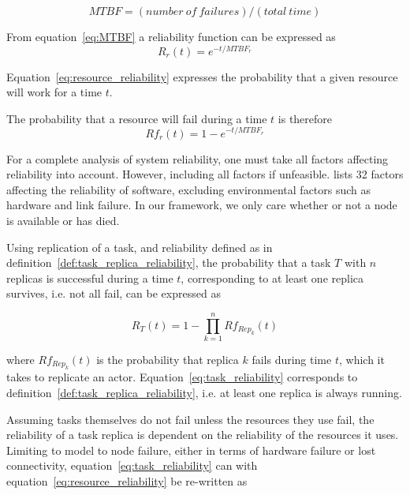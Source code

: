 \documentclass{cslthse-msc}
\begin{document}
\begin{equation} \label{eq:MTBF}
MTBF = (number\ of\ failures) / (total\ time)
\end{equation}

From equation~\ref{eq:MTBF} a reliability function can be expressed as 
\begin{equation} \label{eq:resource_reliability}
R_{r}(t) = e^{-t/MTBF_{r}}
\end{equation}

Equation~\ref{eq:resource_reliability} expresses the probability that a given resource will work for a time $t$.

The probability that a resource will fail during a time $t$ is therefore
\begin{equation} \label{eq:resource_failure}
Rf_{r}(t) = 1 - e^{-t/MTBF_{r}}
\end{equation}

For a complete analysis of system reliability, one must take all factors affecting reliability into account. However, including all factors if unfeasible. \cite{factorsAffectingRel} lists 32 factors affecting the reliability of software, excluding environmental factors such as hardware and link failure. In our framework, we only care whether or not a node is available or has died.

Using replication of a task, and reliability defined as in definition~\ref{def:task_replica_reliability}, the probability that a task $T$ with $n$ replicas is successful during a time $t$, corresponding to at least one replica survives, i.e. not all fail, can be expressed as 

\begin{equation} \label{eq:task_reliability}
R_{T}(t) =  1 - \prod\limits_{k=1}^n Rf_{Rep_k}(t)
\end{equation}

where $Rf_{Rep_k}(t)$ is the probability that replica $k$ fails during time $t$, which it takes to replicate an actor. Equation~\ref{eq:task_reliability} corresponds to definition~\ref{def:task_replica_reliability}, i.e. at least one replica is always running.

Assuming tasks themselves do not fail unless the resources they use fail, the reliability of a task replica is dependent on the reliability of the resources it uses. Limiting to model to node failure, either in terms of hardware failure or lost connectivity, equation~\ref{eq:task_reliability} can with equation~\ref{eq:resource_reliability} be re-written as
\end{document}
